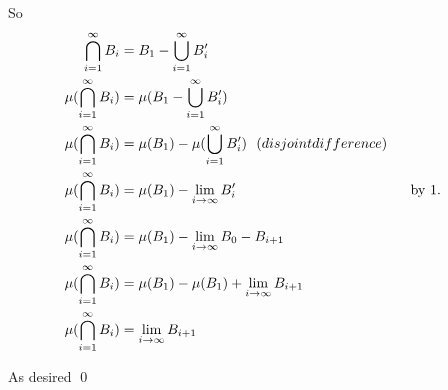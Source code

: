 \documentclass[11pt,oneside]{article}
\numberwithin{equation}{section}
\theoremstyle{definition}
\begin{document}
\begin{solution}
\begin{enumerate}
    So
    \begin{align*}
      \bigcap \limits _{i=1} ^ \infty B_i & = B_1 - \bigcup \limits _{i=1} ^ \infty B'_i & \\
      \mu ( \bigcap \limits _{i=1} ^ \infty B_i ) & = \mu (B_1 - \bigcup \limits _{i=1} ^ \infty B'_i ) & \\
      \mu ( \bigcap \limits _{i=1} ^ \infty B_i ) & = \mu (B_1) - \mu( \bigcup \limits _{i=1} ^ \infty B'_i ) \ \ \text(disjoint difference) & \\
      \mu ( \bigcap \limits _{i=1} ^ \infty B_i ) & = \mu (B_1) - \lim \limits _{i \to \infty}  B'_i & \ \ \text{by $1$}. & \\
      \mu ( \bigcap \limits _{i=1} ^ \infty B_i ) & = \mu (B_1) - \lim \limits _{i \to \infty}  B_0 - B_{i+1} & \\
      \mu ( \bigcap \limits _{i=1} ^ \infty B_i ) & = \mu (B_1) - \mu(B_1) +  \lim \limits _{i \to \infty}  B_{i+1} & \\
      \mu ( \bigcap \limits _{i=1} ^ \infty B_i ) & = \lim \limits _{i \to \infty}  B_{i+1} & \\ 
    \end{align*}

    As desired \qed
    
    
    
    
  \end{enumerate}
\end{solution}
\end{document}
